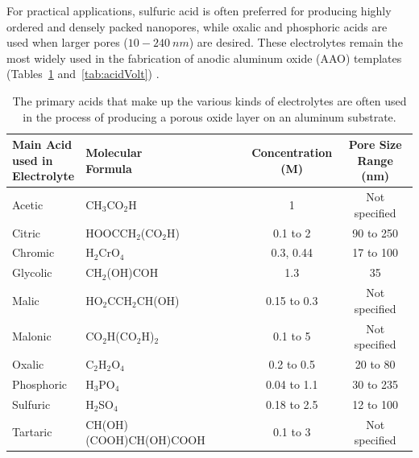 \documentclass{rapportCS}
\begin{document}
	For practical applications, sulfuric acid is often preferred for producing highly ordered and densely packed nanopores, while oxalic and phosphoric acids are used when larger pores ($10 - 240~nm$) are desired. These electrolytes remain the most widely used in the fabrication of anodic aluminum oxide (AAO) templates (Tables~\ref{tab:acids} and~\ref{tab:acidVolt}) \cite{eessaa2023review}.
	

	\begin{table}[h]
		\caption{The primary acids that make up the various kinds of electrolytes are often used in the process of producing a porous oxide layer on an aluminum substrate.}
		\renewcommand\theadfont{\bfseries} %
		\begin{tabular}{|l|l|c|c|}
			\hline
			\thead{Main Acid\\ used in\\ Electrolyte} & \thead{Molecular\\ Formula} & \thead{Concentration\\ (M)} & \thead{Pore Size\\ Range (nm)} \\ \hline
			Acetic & CH$_3$CO$_2$H & 1 & Not specified \\ \hline
			Citric & HOOCCH$_2$(CO$_2$H) & 0.1 to 2 & 90 to 250 \\ \hline
			Chromic & H$_2$CrO$_4$ & 0.3, 0.44 & 17 to 100 \\ \hline
			Glycolic & CH$_2$(OH)COH & 1.3 & 35 \\ \hline
			Malic & HO$_2$CCH$_2$CH(OH) & 0.15 to 0.3 & Not specified \\ \hline
			Malonic & CO$_2$H(CO$_2$H)$_2$ & 0.1 to 5 & Not specified \\ \hline
			Oxalic & C$_2$H$_2$O$_4$ & 0.2 to 0.5 & 20 to 80 \\ \hline
			Phosphoric & H$_3$PO$_4$ & 0.04 to 1.1 & 30 to 235 \\ \hline
			Sulfuric & H$_2$SO$_4$ & 0.18 to 2.5 & 12 to 100 \\ \hline
			Tartaric & CH(OH)(COOH)CH(OH)COOH & 0.1 to 3 & Not specified \\ \hline
		\end{tabular}
		\label{tab:acids}
	\end{table}
	
\end{document}
